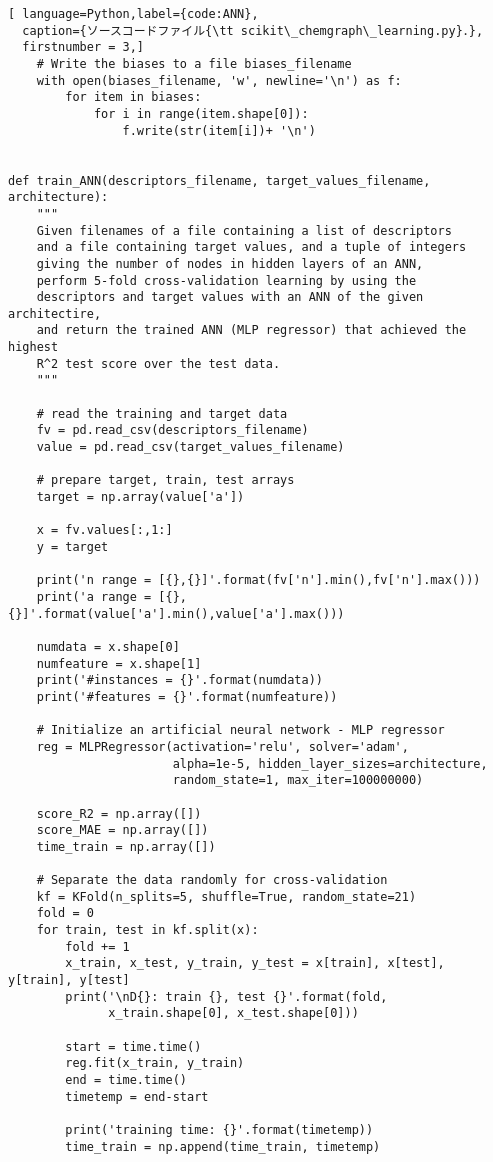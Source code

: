 \documentclass[11pt,titlepage,dvipdfmx,twoside]{jarticle}
\begin{document}
\begin{lstlisting}[ language=Python,label={code:ANN},
  caption={ソースコードファイル{\tt scikit\_chemgraph\_learning.py}．},
  firstnumber = 3,]
    # Write the biases to a file biases_filename
    with open(biases_filename, 'w', newline='\n') as f:
        for item in biases:
            for i in range(item.shape[0]):
                f.write(str(item[i])+ '\n')
    

def train_ANN(descriptors_filename, target_values_filename, architecture):
    """
    Given filenames of a file containing a list of descriptors
    and a file containing target values, and a tuple of integers
    giving the number of nodes in hidden layers of an ANN,
    perform 5-fold cross-validation learning by using the 
    descriptors and target values with an ANN of the given architectire,
    and return the trained ANN (MLP regressor) that achieved the highest
    R^2 test score over the test data.
    """
    
    # read the training and target data
    fv = pd.read_csv(descriptors_filename) 
    value = pd.read_csv(target_values_filename)       
    
    # prepare target, train, test arrays
    target = np.array(value['a'])
    
    x = fv.values[:,1:]
    y = target
    
    print('n range = [{},{}]'.format(fv['n'].min(),fv['n'].max()))
    print('a range = [{},{}]'.format(value['a'].min(),value['a'].max()))
    
    numdata = x.shape[0]
    numfeature = x.shape[1]
    print('#instances = {}'.format(numdata))
    print('#features = {}'.format(numfeature))
    
    # Initialize an artificial neural network - MLP regressor
    reg = MLPRegressor(activation='relu', solver='adam',
                       alpha=1e-5, hidden_layer_sizes=architecture,
                       random_state=1, max_iter=100000000)
    
    score_R2 = np.array([])
    score_MAE = np.array([])
    time_train = np.array([])
    
    # Separate the data randomly for cross-validation
    kf = KFold(n_splits=5, shuffle=True, random_state=21)
    fold = 0
    for train, test in kf.split(x):
        fold += 1
        x_train, x_test, y_train, y_test = x[train], x[test], y[train], y[test]
        print('\nD{}: train {}, test {}'.format(fold, 
              x_train.shape[0], x_test.shape[0]))
    
        start = time.time()
        reg.fit(x_train, y_train)
        end = time.time()
        timetemp = end-start
        
        print('training time: {}'.format(timetemp))
        time_train = np.append(time_train, timetemp)
    

\end{lstlisting}
\end{document}
